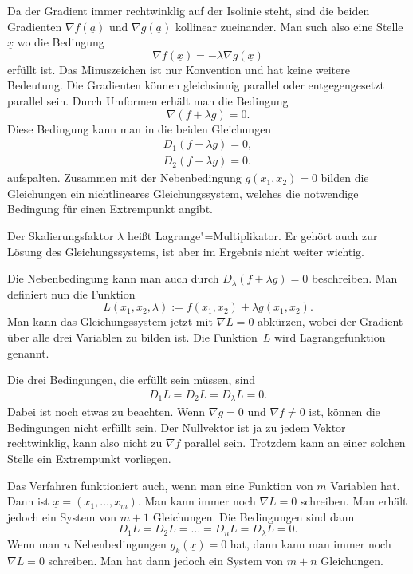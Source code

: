 \documentclass[a4paper,10pt,fleqn,twocolumn,twoside]{article}
\begin{document}
Da der Gradient immer rechtwinklig auf der Isolinie steht, sind die
beiden Gradienten $\nabla f(\underline a)$ und
$\nabla g(\underline a)$ kollinear zueinander. Man such also eine
Stelle $\underline x$ wo die Bedingung
\[\nabla f(\underline x) = -\lambda\nabla g(\underline x)\]
erfüllt ist. Das Minuszeichen ist nur Konvention und hat keine weitere
Bedeutung. Die Gradienten können
gleichsinnig parallel oder entgegengesetzt parallel sein.
Durch Umformen erhält man die Bedingung
\[\nabla (f+\lambda g)=0.\]
Diese Bedingung kann man in die beiden Gleichungen
\begin{gather*}
D_1(f+\lambda g)=0,\\
D_2(f+\lambda g)=0.
\end{gather*}
aufspalten. Zusammen mit der Nebenbedingung $g(x_1,x_2)=0$ bilden
die Gleichungen ein nichtlineares Gleichungssystem, welches die
notwendige Bedingung für einen Extrempunkt angibt.

Der Skalierungsfaktor $\lambda$ heißt Lagrange"=Multiplikator.
Er gehört auch zur Lösung des Gleichungssystems, ist aber
im Ergebnis nicht weiter wichtig.

Die Nebenbedingung kann man auch durch
$D_\lambda (f+\lambda g)=0$ beschreiben.
Man definiert nun die Funktion
\[L(x_1,x_2,\lambda) := f(x_1,x_2)+\lambda g(x_1,x_2).\]
Man kann das Gleichungssystem jetzt mit $\nabla L=0$
abkürzen, wobei der Gradient über alle drei Variablen zu bilden ist.
Die Funktion~$L$ wird Lagrangefunktion genannt.

Die drei Bedingungen, die erfüllt sein müssen, sind
\begin{gather*}
D_1 L = D_2 L = D_\lambda L = 0.
\end{gather*}
Dabei ist noch etwas zu beachten. Wenn $\nabla g=0$ und
$\nabla f\ne 0$ ist, können die Bedingungen
nicht erfüllt sein. Der Nullvektor ist ja zu jedem Vektor
rechtwinklig, kann also nicht zu $\nabla f$ parallel sein.
Trotzdem kann an einer solchen Stelle ein Extrempunkt vorliegen.

Das Verfahren funktioniert auch, wenn man eine Funktion von $m$
Variablen hat. Dann ist $\underline x=(x_1,\ldots,x_m).$
Man kann immer noch $\nabla L=0$ schreiben. Man erhält jedoch ein
System von $m+1$ Gleichungen. Die Bedingungen sind dann
\[D_1 L = D_2 L = \ldots = D_n L = D_\lambda L = 0.\]
%
Wenn man $n$ Nebenbedingungen $g_k(\underline x)=0$ hat,
dann kann man immer noch $\nabla L=0$ schreiben.
Man hat dann jedoch ein System von $m+n$ Gleichungen.
\end{document}
